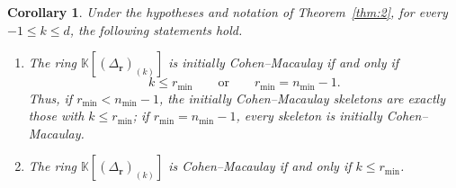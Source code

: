 \documentclass[10pt,a4paper]{amsart}
\newtheorem{corollary}{Corollary}
\newcommand{\K}{\mathbb K}
\newcommand{\SR}[1]{\K[#1]}
\begin{document}
	\begin{corollary}\label{cor:3}
		Under the hypotheses and notation of Theorem~\ref{thm:2}, for every $-1\le k\le d$, the following statements hold.
		\begin{enumerate}
			\item[(i)] The ring $\SR{(\Delta_{\mathbf r})_{(k)}}$ is initially Cohen--Macaulay if and only if
			\[
			k\le r_{\min}
			\qquad\text{or}\qquad
			r_{\min}=n_{\min}-1.
			\]
			Thus, if $r_{\min}<n_{\min}-1$, the initially Cohen--Macaulay skeletons are exactly those with $k\le r_{\min}$; if $r_{\min}=n_{\min}-1$, every skeleton is initially Cohen--Macaulay.
			
			\item[(ii)] The ring $\SR{(\Delta_{\mathbf r})_{(k)}}$ is Cohen--Macaulay if and only if $k\le r_{\min}$.
		\end{enumerate}
	\end{corollary}
\end{document}
